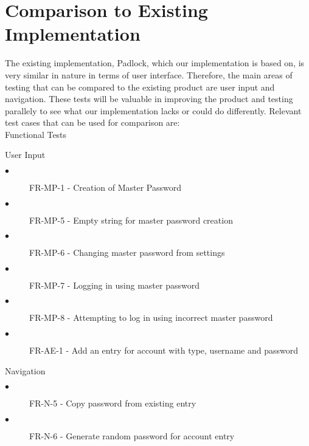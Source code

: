\documentclass[12pt, titlepage]{article}
\begin{document}
\section{Comparison to Existing Implementation}	
				
The existing implementation, Padlock, which our implementation is based on, is very similar in nature in terms of user interface. Therefore, the main areas of testing that can be compared to the existing product are user input and navigation. These tests will be valuable in improving the product and testing parallely to see what our implementation lacks or could do differently. Relevant test cases that can be used for comparison are:\\

Functional Tests
\begin{description} 
    \item User Input
    \begin{description}
        \item[$\bullet$] FR-MP-1 - Creation of Master Password
        \item[$\bullet$] FR-MP-5 - Empty string for master password creation
        \item[$\bullet$] FR-MP-6 - Changing master password from settings
        \item[$\bullet$] FR-MP-7 - Logging in using master password
        \item[$\bullet$] FR-MP-8 - Attempting to log in using incorrect master password
        \item[$\bullet$] FR-AE-1 - Add an entry for account with type, username and password
    \end{description}
    \item Navigation
    \begin{description}
        \item[$\bullet$] FR-N-5 - Copy password from existing entry
        \item[$\bullet$] FR-N-6 - Generate random password for account entry
    \end{description}
\end{description}
\end{document}
